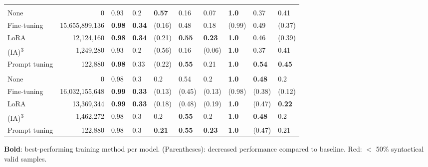 \begin{table*}[htbp]
\begin{threeparttable}
\begin{tabularx}{\textwidth}{lr!{\color{white}\hspace{.5em}}YYYYY!{\color{white}\hspace{1em}}YYY}
         \bigstrut \\*
        None & 0 & 0.93 & 0.2 & \textbf{0.57} & 0.16 & 0.07 & \textbf{1.0} & 0.37 & 0.41 \\
        Fine-tuning & 15,655,899,136 & \textbf{0.98} & \textbf{0.34} & (0.16) & 0.48 & 0.18 & (0.99) & 0.49 & (0.37) \\
        LoRA & 12,124,160 & \textbf{0.98} & \textbf{0.34} & (0.21) & \textbf{0.55} & \textbf{0.23} & \textbf{1.0} & 0.46 & (0.39) \\
        (IA)\textsuperscript{3} & 1,249,280 & 0.93 & 0.2 & (0.56) & 0.16 & (0.06) & \textbf{1.0} & 0.37 & 0.41 \\
        Prompt tuning & 122,880 & \textbf{0.98} & 0.33 & (0.22) & \textbf{0.55} & 0.21 & \textbf{1.0} & \textbf{0.54} & \textbf{0.45} \\

         \bigstrut \\*
        None & 0 & 0.98 & 0.3 & 0.2 & 0.54 & 0.2 & \textbf{1.0} & \textbf{0.48} & 0.2 \\
        Fine-tuning & 16,032,155,648 & \textbf{0.99} & \textbf{0.33} & (0.13) & (0.45) & (0.13) & (0.98) & (0.38) & (0.12) \\
        LoRA & 13,369,344 & \textbf{0.99} & \textbf{0.33} & (0.18) & (0.48) & (0.19) & \textbf{1.0} & (0.47) & \textbf{0.22} \\
        (IA)\textsuperscript{3} & 1,462,272 & 0.98 & 0.3 & 0.2 & \textbf{0.55} & 0.2 & \textbf{1.0} & \textbf{0.48} & 0.2 \\
        Prompt tuning & 122,880 & 0.98 & 0.3 & \textbf{0.21} & \textbf{0.55} & \textbf{0.23} & \textbf{1.0} & (0.47) & 0.21 \\

       \bottomrule
    \end{tabularx}
    \begin{tablenotes}[flushleft]\small
      \item \textbf{Bold}: best-performing training method per model. (Parentheses): decreased performance compared to baseline. \colorbox{red!10}{Red}: $<$ 50\% syntactical valid samples.
    \end{tablenotes}
\end{threeparttable}
\end{table*}